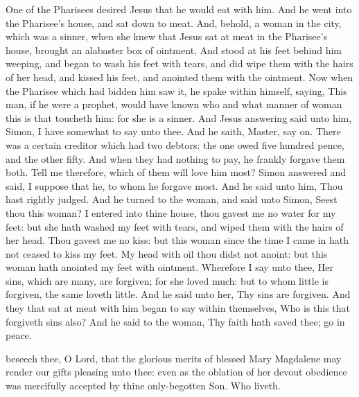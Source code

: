  One of the Pharisees desired Jesus that he would eat with him. And he went into the Pharisee's house, and sat down to meat. And, behold, a woman in the city, which was a sinner, when she knew that Jesus sat at meat in the Pharisee's house, brought an alabaster box of ointment, And stood at his feet behind him weeping, and began to wash his feet with tears, and did wipe them with the hairs of her head, and kissed his feet, and anointed them with the ointment. Now when the Pharisee which had bidden him saw it, he spake within himself, saying, This man, if he were a prophet, would have known who and what manner of woman this is that toucheth him: for she is a sinner. And Jesus answering said unto him, Simon, I have somewhat to say unto thee. And he saith, Master, say on. There was a certain creditor which had two debtors: the one owed five hundred pence, and the other fifty. And when they had nothing to pay, he frankly forgave them both. Tell me therefore, which of them will love him most? Simon answered and said, I suppose that he, to whom he forgave most. And he said unto him, Thou hast rightly judged. And he turned to the woman, and said unto Simon, Seest thou this woman? I entered into thine house, thou gavest me no water for my feet: but she hath washed my feet with tears, and wiped them with the hairs of her head. Thou gavest me no kiss: but this woman since the time I came in hath not ceased to kiss my feet. My head with oil thou didst not anoint: but this woman hath anointed my feet with ointment. Wherefore I say unto thee, Her sins, which are many, are forgiven; for she loved much: but to whom little is forgiven, the same loveth little. And he said unto her, Thy sins are forgiven. And they that sat at meat with him began to say within themselves, Who is this that forgiveth sins also? And he said to the woman, Thy faith hath saved thee; go in peace.


\secret
{} beseech thee, O Lord, that the glorious merits of blessed Mary Magdalene may render our gifts pleasing unto thee: even as the oblation of her devout obedience was mercifully accepted by thine only-begotten Son. Who liveth.


